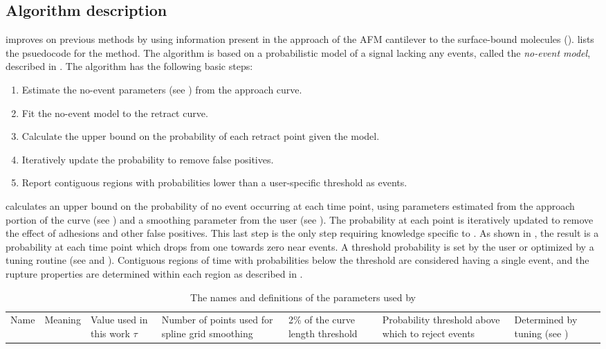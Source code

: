 \subsection{Algorithm description}

\name{} improves on previous methods by using information present in the approach of the AFM cantilever to the surface-bound molecules ().   lists the psuedocode for the method. The algorithm is based on a probabilistic model of a signal lacking any events, called the \textit{no-event model}, described in . The algorithm has the following basic steps:

\begin{enumerate}
\item Estimate the no-event parameters (see ) from the approach curve.
\item Fit the no-event model to the retract curve.
\item Calculate the upper bound on the probability of each retract point given the model.
\item Iteratively update the probability to remove false positives.
\item Report contiguous regions with probabilities lower than a user-specific threshold as events.
\end{enumerate}

 \name{} calculates an upper bound on the probability of no event occurring at each time point, using parameters estimated from the approach portion of the curve (see ) and a smoothing parameter from the user (see ). The probability at each point is iteratively updated to remove the effect of adhesions and other false positives. This last step is the only step requiring knowledge specific to \singlemol{}. As shown in , the result is a probability at each time point which drops from one towards zero near events. A threshold probability is set by the user or optimized by a tuning routine (see  and ). Contiguous regions of time with probabilities below the threshold are considered having a single event, and the rupture properties are determined within each region as described in .


\begin{table}
\caption[Algorithm parameters]{ The names and definitions of the parameters used by \name{}}
\begin{tabularx}{\textwidth}{ l | l | l | l  }
\hline \hline
Name & Meaning  & Value used in this work \e
$\tau$ & Number of points used for spline grid smoothing & 2\% of the curve length \e
threshold & Probability threshold above which to reject events  & Determined by tuning (see ) \e
\end{tabularx}
\end{table}



